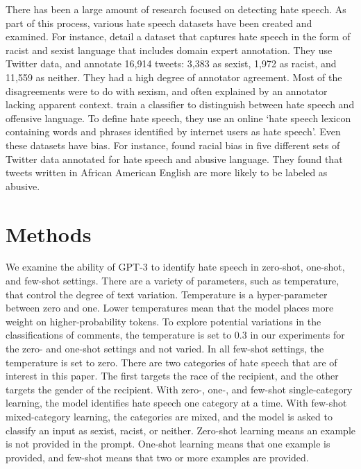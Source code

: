 \documentclass[12pt,]{article}
\begin{document}
There has been a large amount of research focused on detecting hate speech. As part of this process, various hate speech datasets have been created and examined. For instance, \citet{waseem2016hateful} detail a dataset that captures hate speech in the form of racist and sexist language that includes domain expert annotation. They use Twitter data, and annotate 16,914 tweets: 3,383 as sexist, 1,972 as racist, and 11,559 as neither. They had a high degree of annotator agreement. Most of the disagreements were to do with sexism, and often explained by an annotator lacking apparent context. \citet{davidson2017automated} train a classifier to distinguish between hate speech and offensive language. To define hate speech, they use an online `hate speech lexicon containing words and phrases identified by internet users as hate speech'. Even these datasets have bias. For instance, \citet{davidson2019racial} found racial bias in five different sets of Twitter data annotated for hate speech and abusive language. They found that tweets written in African American English are more likely to be labeled as abusive.

\hypertarget{methods}{%
\section{Methods}\label{methods}}

We examine the ability of GPT-3 to identify hate speech in zero-shot, one-shot, and few-shot settings. There are a variety of parameters, such as temperature, that control the degree of text variation. Temperature is a hyper-parameter between zero and one. Lower temperatures mean that the model places more weight on higher-probability tokens. To explore potential variations in the classifications of comments, the temperature is set to 0.3 in our experiments for the zero- and one-shot settings and not varied. In all few-shot settings, the temperature is set to zero. There are two categories of hate speech that are of interest in this paper. The first targets the race of the recipient, and the other targets the gender of the recipient. With zero-, one-, and few-shot single-category learning, the model identifies hate speech one category at a time. With few-shot mixed-category learning, the categories are mixed, and the model is asked to classify an input as sexist, racist, or neither. Zero-shot learning means an example is not provided in the prompt. One-shot learning means that one example is provided, and few-shot means that two or more examples are provided.
\end{document}
